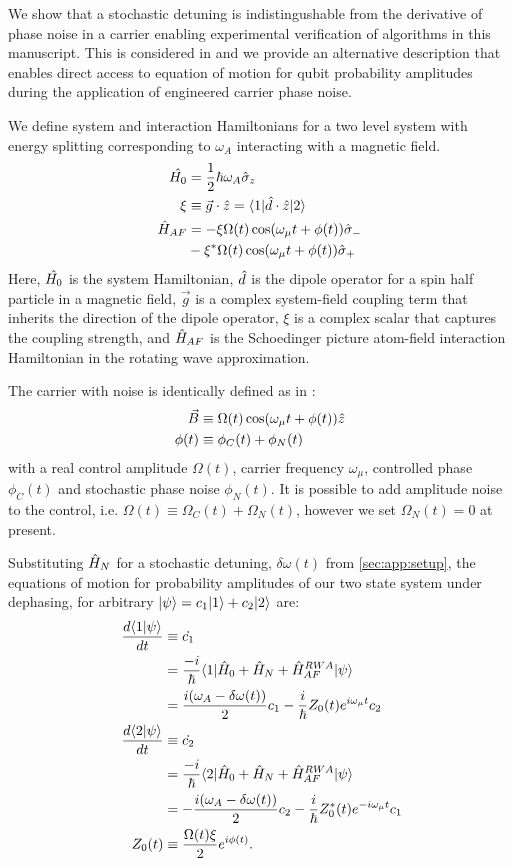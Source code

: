 We show that a stochastic detuning is indistingushable from the derivative of phase noise in a carrier enabling experimental verification of algorithms in this manuscript.
This is considered in \cite{soare2014} and we provide an alternative description that enables direct access to equation of motion for qubit probability amplitudes during the application of engineered carrier phase noise. 

We define system and interaction Hamiltonians for a two level system with energy splitting corresponding to $\omega_A$  interacting with a magnetic field. 
\\
\begin{align}
\hat{H_0} &= \frac{1}{2} \hbar \omega_A \hat{\sigma}_{z} \\
\xi & \equiv \vec{g} \cdot \hat{z} = \langle 1 | \hat{d} \cdot \hat{z} | 2 \rangle \\
\hat{H}_{AF} & = -\xi \Omega(t)  \cos(\omega_\mu t + \phi(t)) \hat{\sigma}_{-} \\
& - \xi^* \Omega(t)  \cos(\omega_\mu t + \phi(t)) \hat{\sigma}_{+}
\end{align} Here, $\hat{H_0}$ is the system Hamiltonian, $\hat{d}$ is the dipole operator for a spin half particle in a magnetic field, $\vec{g}$ is a complex system-field coupling term that inherits the direction of the dipole operator, $\xi$ is a complex scalar that captures the coupling strength, and $\hat{H}_{AF}$ is the Schoedinger picture atom-field interaction Hamiltonian in the rotating wave approximation.

The carrier with noise is identically defined as in \cite{soare2014}:
\begin{align}
\vec{B} &\equiv \Omega(t) \cos(\omega_\mu t + \phi(t)) \hat{z} \\
\phi(t) & \equiv \phi_C(t) + \phi_N(t)
\end{align}
with a real control amplitude $\Omega(t)$, carrier frequency $\omega_\mu$, controlled phase $\phi_C(t)$ and stochastic phase noise $\phi_N(t)$.  It is possible to add amplitude noise to the control, i.e. $\Omega(t) \equiv \Omega_C(t) + \Omega_N(t)$, however we set $\Omega_N(t) =0$ at present. 

Substituting $\hat{H}_{N}$ for a stochastic detuning, $\delta \omega (t)$ from \cref{sec:app:setup}, the equations of motion for probability amplitudes of our two state system under dephasing, for arbitrary $| \psi \rangle = c_1 | 1 \rangle + c_2| 2 \rangle $ are:
\begin{align}
\frac{d \langle 1 |\psi\rangle}{dt} &\equiv \dot{c_1} \\
& = \frac{-i}{\hbar}\langle 1 | \hat{H}_0 + \hat{H}_{N} + \hat{H}_{AF}^{RWA}  | \psi \rangle \\
& = \frac{i(\omega_A - \delta\omega(t)) }{2}c_1 - \frac{i}{\hbar}Z_0(t) e^{i\omega_\mu t}c_2\\
\frac{d \langle 2 |\psi\rangle}{dt} &\equiv \dot{c_2} \\
& = \frac{-i}{\hbar}\langle 2 | \hat{H}_0 + \hat{H}_{N} + \hat{H}_{AF}^{RWA}  | \psi \rangle \\
& = -\frac{i(\omega_A - \delta\omega(t)) }{2}c_2 - \frac{i}{\hbar}Z_0^*(t) e^{-i\omega_\mu t}c_1 \\
\quad Z_0(t) &\equiv \frac{\Omega(t)\xi}{2}e^{i\phi(t)}.
\end{align}

